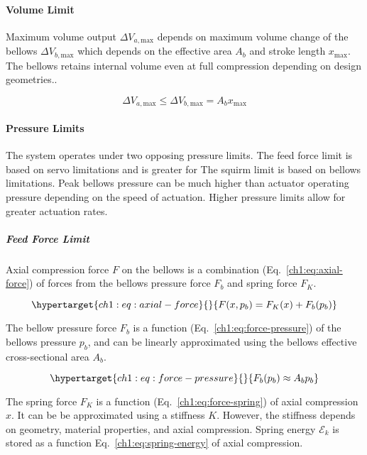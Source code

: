 \hypertarget{ch1:volume-limit}{%
\paragraph{Volume Limit}\label{ch1:volume-limit}}

Maximum volume output \(\Delta V_{a,\text{max}}\) depends on maximum
volume change of the bellows \(\Delta V_{b,\text{max}}\) which depends
on the effective area \(A_b\) and stroke length \(x_\text{max}\). The
bellows retains internal volume even at full compression depending on
design geometries..

\[ \Delta V_{a,\text{max}} \le \Delta V_{b,\text{max}}   
= A_b x_\text{max}
\]

\hypertarget{ch1:pressure-limits}{%
\paragraph{Pressure Limits}\label{ch1:pressure-limits}}

The system operates under two opposing pressure limits. The feed force
limit is based on servo limitations and is greater for The squirm limit
is based on bellows limitations. Peak bellows pressure can be much
higher than actuator operating pressure depending on the speed of
actuation. Higher pressure limits allow for greater actuation rates.

\hypertarget{ch1:feed-force-limit}{%
\subparagraph{Feed Force Limit}\label{ch1:feed-force-limit}}

Axial compression force \(F\) on the bellows is a combination
(Eq.~\ref{ch1:eq:axial-force}) of forces from the bellows pressure force
\(F_b\) and spring force \(F_K\).

\begin{equation}\protect\hypertarget{ch1:eq:axial-force}{}{ F(x,p_b) = F_K(x) + F_b(p_b)   
}\label{ch1:eq:axial-force}\end{equation}

The bellow pressure force \(F_b\) is a function
(Eq.~\ref{ch1:eq:force-pressure}) of the bellows pressure \(p_b\), and can
be linearly approximated using the bellows effective cross-sectional
area \(A_b\).

\begin{equation}\protect\hypertarget{ch1:eq:force-pressure}{}{ F_b(p_b) \approx A_b p_b   
}\label{ch1:eq:force-pressure}\end{equation}

The spring force \(F_K\) is a function (Eq.~\ref{ch1:eq:force-spring}) of
axial compression \(x\). It can be be approximated using a stiffness
\(K\). However, the stiffness depends on geometry, material properties,
and axial compression. Spring energy \(\mathcal{E}_k\) is stored as a
function Eq.~\ref{ch1:eq:spring-energy} of axial compression.

